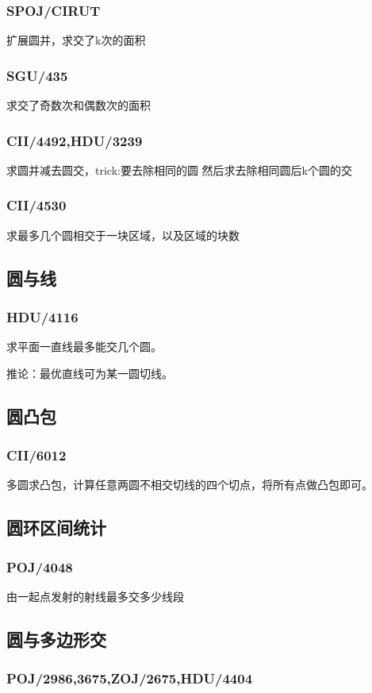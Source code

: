 \subsubsection{SPOJ/CIRUT}
扩展圆并，求交了k次的面积

\subsubsection{SGU/435}
求交了奇数次和偶数次的面积

\subsubsection{CII/4492,HDU/3239}
求圆并减去圆交，trick:要去除相同的圆
然后求去除相同圆后k个圆的交

\subsubsection{CII/4530}
求最多几个圆相交于一块区域，以及区域的块数


\subsection{圆与线}
\subsubsection{HDU/4116}
求平面一直线最多能交几个圆。

推论：最优直线可为某一圆切线。


\subsection{圆凸包}
\subsubsection{CII/6012}
多圆求凸包，计算任意两圆不相交切线的四个切点，将所有点做凸包即可。


\subsection{圆环区间统计}
\subsubsection{POJ/4048}
由一起点发射的射线最多交多少线段


\subsection{圆与多边形交}
\subsubsection{POJ/2986,3675,ZOJ/2675,HDU/4404}


